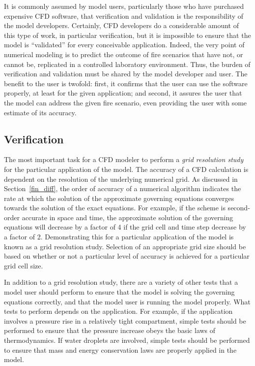 \documentclass[graybox]{svmult}
\begin{document}
It is commonly assumed by model users, particularly those who have purchased expensive CFD software, that verification and validation is the responsibility of the model developers. Certainly, CFD developers do a considerable amount of this type of work, in particular verification, but it is impossible to ensure that the model is ``validated'' for every conceivable application. Indeed, the very point of numerical modeling is to predict the outcome of fire scenarios that have not, or cannot be, replicated in a controlled laboratory environment. Thus, the burden of verification and validation must be shared by the model developer and user. The benefit to the user is twofold: first, it confirms that the user can use the software properly, at least for the given application; and second, it assures the user that the model can address the given fire scenario, even providing the user with some estimate of its accuracy.

\subsection{Verification}

The most important task for a CFD modeler to perform a {\em grid resolution study} for the particular application of the model.
The accuracy of a CFD calculation is dependent on the resolution of the underlying numerical grid. As discussed in Section~\ref{fin_diff}, the order of accuracy of a numerical algorithm indicates the rate at which the solution of the approximate governing equations converges towards the solution of the exact equations. For example, if the scheme is second-order accurate in space and time, the approximate solution of the governing equations will decrease by a factor of 4 if the grid cell and time step decrease by a factor of 2. Demonstrating this for a particular application of the model is known as a grid resolution study. Selection of an appropriate grid size should be based on whether or not a particular level of accuracy is achieved for a particular grid cell size.

In addition to a grid resolution study, there are a variety of other tests that a model user should perform to ensure that the model is solving the governing equations correctly, and that the model user is running the model properly. What tests to perform depends on the application. For example, if the application involves a pressure rise in a relatively tight compartment, simple tests should be performed to ensure that the pressure increase obeys the basic laws of thermodynamics. If water droplets are involved, simple tests should be performed to ensure that mass and energy conservation laws are properly applied in the model.
\end{document}
